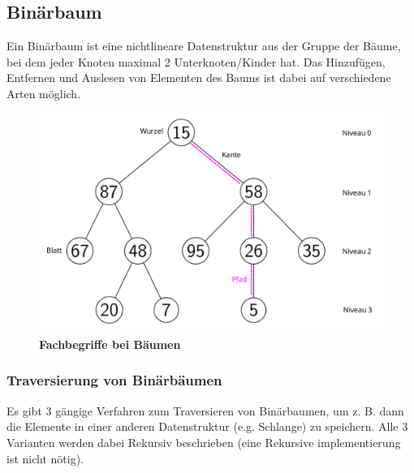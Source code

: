 \subsection{Binärbaum}

Ein Binärbaum ist eine nichtlineare Datenstruktur aus der Gruppe der Bäume, bei dem
jeder Knoten maximal 2 Unterknoten/Kinder hat. Das Hinzufügen, Entfernen und Auslesen
von Elementen des Baums ist dabei auf verschiedene Arten möglich.

\begin{figure}[H]
    \centering
    \includegraphics[width=1\textwidth]{images/baum_begriffe.png}
    \caption{\textbf{Fachbegriffe bei Bäumen}}
\end{figure}


\subsubsection{Traversierung von Binärbäumen}

Es gibt 3 gängige Verfahren zum Traversieren von Binärbaumen, um z. B. dann die Elemente
in einer anderen Datenstruktur (e.g. Schlange) zu speichern.
Alle 3 Varianten werden dabei Rekursiv beschrieben (eine Rekursive implementierung ist nicht nötig).




